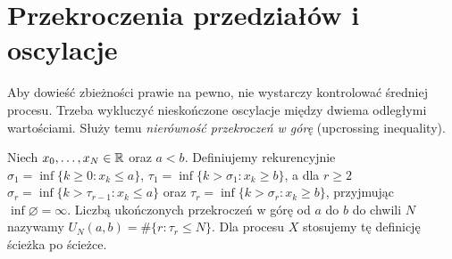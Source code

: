 \section{Przekroczenia przedziałów i oscylacje}

Aby dowieść zbieżności prawie na pewno, nie wystarczy
kontrolować średniej procesu. Trzeba wykluczyć
nieskończone oscylacje między dwiema odległymi
wartościami. Służy temu \emph{nierówność
przekroczeń w górę} (upcrossing inequality).

\begin{definicja}
Niech $x_0,\ldots,x_N\in\mathbb{R}$ oraz $a<b$.
Definiujemy rekurencyjnie
$\sigma_1=\inf\{k\geq0:x_k\leq a\}$,
$\tau_1=\inf\{k>\sigma_1:x_k\geq b\}$,
a dla $r\geq2$
$\sigma_r=\inf\{k>\tau_{r-1}:x_k\leq a\}$
oraz $\tau_r=\inf\{k>\sigma_r:x_k\geq b\}$,
przyjmując $\inf\varnothing=\infty$.
Liczbą ukończonych przekroczeń w górę
od $a$ do $b$ do chwili $N$ nazywamy
$U_N(a,b)=\#\{r:\tau_r\leq N\}$.
Dla procesu $X$ stosujemy tę definicję
ścieżka po ścieżce.
\end{definicja}

